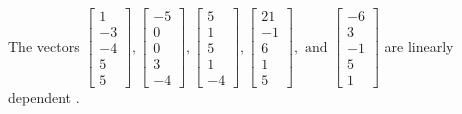 \begin{exercise}
\begin{exerciseStatement}
  \end{exerciseStatement}
  \begin{exerciseAnswer}
   The vectors \(\left[\begin{array}{r}
1 \\
-3 \\
-4 \\
5 \\
5
\end{array}\right] , \left[\begin{array}{r}
-5 \\
0 \\
0 \\
3 \\
-4
\end{array}\right] , \left[\begin{array}{r}
5 \\
1 \\
5 \\
1 \\
-4
\end{array}\right] , \left[\begin{array}{r}
21 \\
-1 \\
6 \\
1 \\
5
\end{array}\right] , \text{ and } \left[\begin{array}{r}
-6 \\
3 \\
-1 \\
5 \\
1
\end{array}\right]\) are 
  	 linearly dependent  .
  


  \end{exerciseAnswer}
\end{exercise}